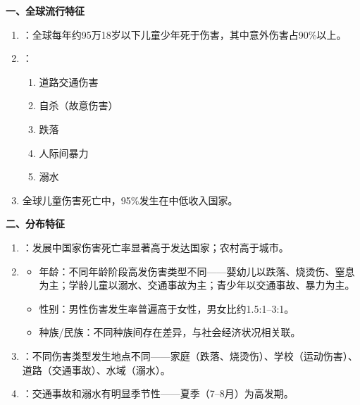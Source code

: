 \begin{keybox}
\textbf{一、全球流行特征}
\begin{enumerate}[leftmargin=*]
    \item {}：全球每年约95万18岁以下儿童少年死于伤害，其中意外伤害占90\%以上。
    \item {}：
    \begin{enumerate}
        \item 道路交通伤害
        \item 自杀（故意伤害）
        \item 跌落
        \item 人际间暴力
        \item 溺水
    \end{enumerate}
    \item 全球儿童伤害死亡中，95\%发生在中低收入国家。
\end{enumerate}

\textbf{二、分布特征}
\begin{enumerate}[leftmargin=*]
    \item {}：发展中国家伤害死亡率显著高于发达国家；农村高于城市。
    \item {}
    \begin{itemize}
        \item 年龄：不同年龄阶段高发伤害类型不同——婴幼儿以跌落、烧烫伤、窒息为主；学龄儿童以溺水、交通事故为主；青少年以交通事故、暴力为主。
        \item 性别：男性伤害发生率普遍高于女性，男女比约1.5:1--3:1。
        \item 种族/民族：不同种族间存在差异，与社会经济状况相关联。
    \end{itemize}
    \item {}：不同伤害类型发生地点不同——家庭（跌落、烧烫伤）、学校（运动伤害）、道路（交通事故）、水域（溺水）。
    \item {}：交通事故和溺水有明显季节性——夏季（7--8月）为高发期。
\end{enumerate}


\end{keybox}
